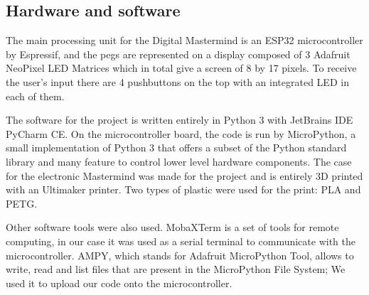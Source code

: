 \documentclass[a4paper, 11pt]{article}
\begin{document}
\subsection{Hardware and software}
The main processing unit for the Digital Mastermind is an ESP32
microcontroller by Espressif, and the pegs are represented on a display
composed of 3 Adafruit NeoPixel LED Matrices which in total give a
screen of 8 by 17 pixels. To receive the user’s input there are 4
pushbuttons on the top with an integrated LED in each of them.
\begin{figure}[H]%
    \centering
    \quad%
\end{figure}
The software for the project is written entirely in Python 3 with JetBrains
IDE PyCharm CE. On the microcontroller board, the code is run by MicroPython,
a small implementation of Python 3 that offers a subset of the Python standard
library and many feature to control lower level hardware components. The case
for the electronic Mastermind was made for the project and is entirely 3D
printed with an Ultimaker printer. Two types of plastic were used for the
print: PLA and PETG.  \par Other software tools were also used.  MobaXTerm is a set
of tools for remote computing, in our case it was used as a serial terminal to
communicate with the microcontroller. AMPY, which stands for Adafruit
MicroPython Tool, allows to write, read and list files that are present in the
MicroPython File System; We used it to upload our code onto the
microcontroller.
\end{document}
